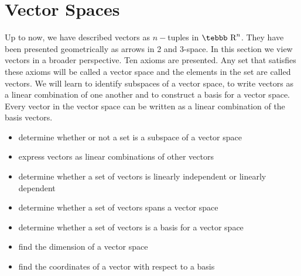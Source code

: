 \setcounter{equation}{0}

\chapter{Vector Spaces}
\label{sec.vspace} \pagestyle{myheadings}

Up to now, we have described vectors as $n-$tuples in
$\mbox{\tebbb R}^n$. They have been presented geometrically as
arrows in 2 and 3-space. In this section we view vectors in a
broader perspective. Ten axioms are presented. Any set that
satisfies these axioms will be called a vector space and the
elements in the set are called vectors. We will learn to identify
subspaces of a vector space, to write vectors as a linear
combination of one another and to construct a basis for a vector
space. Every vector in the vector space can be written as a linear
combination of the basis vectors.

\begin{itemize}
\item determine whether or not a set is a subspace of a vector space
\item express vectors as linear combinations of other vectors
\item determine whether a set of vectors is linearly independent
or linearly dependent
\item determine whether a set of vectors spans a vector space
\item determine whether a set of vectors is a basis for a vector
space
\item find the dimension of a vector space
\item find the coordinates of a vector with respect to a basis
\end{itemize}

